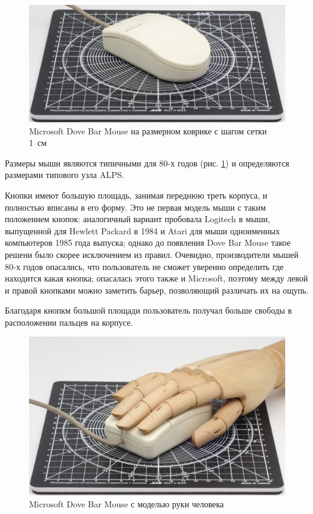\documentclass[11pt, a4paper]{article}
\begin{document}
\begin{figure}[h]
    \centering
    \includegraphics[scale=0.5]{1987_microsoft_dove_bar_mouse/size.jpg}
    \caption{Microsoft Dove Bar Mouse на размерном коврике с шагом сетки 1~см}
    \label{fig:MicrosoftDoveBarSize}
\end{figure}

Размеры мыши являются типичными для 80-х годов (рис. \ref{fig:MicrosoftDoveBarSize}) и определяются размерами типового узла ALPS.

Кнопки имеют большую площадь, занимая переднюю треть корпуса, и полностью вписаны в его форму. Это не первая модель мыши с таким положением кнопок: аналогичный вариант пробовала Logitech в мыши, выпущенной для Hewlett Packard в 1984 и Atari для мыши одноименных компьютеров 1985 года выпуска; однако до появления Dove Bar Mouse такое решени было скорее исключением из правил. Очевидно, производители мышей 80-х годов опасались, что пользователь не сможет уверенно определить где находится какая кнопка; опасалась этого также и Microsoft, поэтому между левой и правой кнопками можно заметить барьер, позволяющий различать их на ощупь.

Благодаря кнопкм большой площади пользователь получал больше свободы в расположении пальцев на корпусе. 

\begin{figure}[h]
    \centering
    \includegraphics[scale=0.5]{1987_microsoft_dove_bar_mouse/hand.jpg}
    \caption{Microsoft Dove Bar Mouse с моделью руки человека}
    \label{fig:MicrosoftDoveBarHand}
\end{figure}
\end{document}
